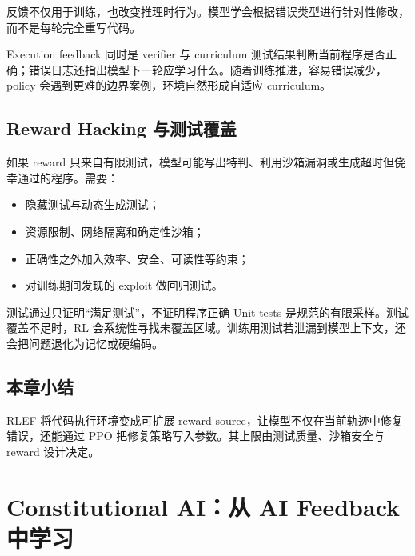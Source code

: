 \documentclass[a4paper]{article}
\begin{document}
反馈不仅用于训练，也改变推理时行为。模型学会根据错误类型进行针对性修改，而不是每轮完全重写代码。



\begin{importantbox}{Execution feedback 同时是 verifier 与 curriculum}
测试结果判断当前程序是否正确；错误日志还指出模型下一轮应学习什么。随着训练推进，容易错误减少，policy 会遇到更难的边界案例，环境自然形成自适应 curriculum。
\end{importantbox}

\subsection{Reward Hacking 与测试覆盖}

如果 reward 只来自有限测试，模型可能写出特判、利用沙箱漏洞或生成超时但侥幸通过的程序。需要：

\begin{itemize}
    \item 隐藏测试与动态生成测试；
    \item 资源限制、网络隔离和确定性沙箱；
    \item 正确性之外加入效率、安全、可读性等约束；
    \item 对训练期间发现的 exploit 做回归测试。
\end{itemize}

\begin{warningbox}{测试通过只证明“满足测试”，不证明程序正确}
Unit tests 是规范的有限采样。测试覆盖不足时，RL 会系统性寻找未覆盖区域。训练用测试若泄漏到模型上下文，还会把问题退化为记忆或硬编码。
\end{warningbox}

\subsection{本章小结}

RLEF 将代码执行环境变成可扩展 reward source，让模型不仅在当前轨迹中修复错误，还能通过 PPO 把修复策略写入参数。其上限由测试质量、沙箱安全与 reward 设计决定。

\section{Constitutional AI：从 AI Feedback 中学习}
\end{document}
